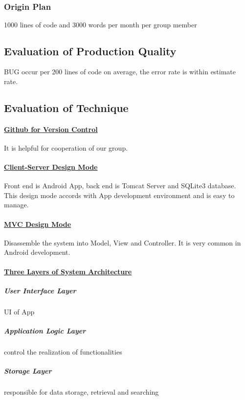 \documentclass[10pt]{article}
\begin{document}
\subsubsection{Origin Plan}
1000 lines of code and 3000 words per month per group member

\subsection{Evaluation of Production Quality}
BUG occur per 200 lines of code on average, the error rate is within estimate rate.

\subsection{Evaluation of Technique}
\paragraph{\underline{Github for Version Control}} It is helpful for cooperation of our group.

\paragraph{\underline{Client-Server Design Mode}} Front end is Android App, back end is Tomcat Server and SQLite3 database. This design mode accords with App development environment and is easy to manage.

\paragraph{\underline{MVC Design Mode}} Disassemble the system into Model, View and Controller. It is very common in Android development.

\paragraph{\underline{Three Layers of System Architecture}}
\subparagraph{User Interface Layer} UI of App

\subparagraph{Application Logic Layer} control the realization of functionalities

\subparagraph{Storage Layer} responsible for data storage, retrieval and searching
\end{document}
